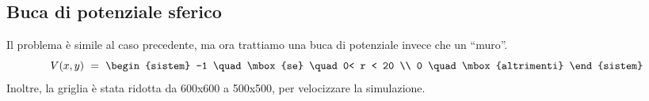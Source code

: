 \subsection{Buca di potenziale sferico}
Il problema è simile al caso precedente, ma ora trattiamo una buca di potenziale invece che un ``muro''.
$$
V(x,y) \ = \ \begin{sistem}
             -1 \quad \mbox{se} \quad  0< r < 20 \\
              0 \quad \mbox{altrimenti}
             \end{sistem}
$$
Inoltre, la griglia è stata ridotta da 600x600 a 500x500, per velocizzare la simulazione.
\begin{figure}[hp]
 \centering

\end{figure}

